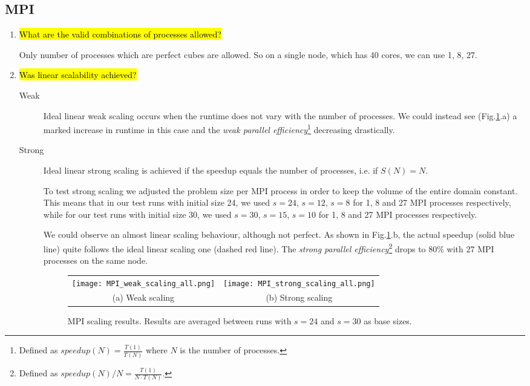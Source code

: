 \documentclass{article}
\begin{document}
\subsection{MPI}
\begin{enumerate}
	\item \hl{What are the valid combinations of processes allowed?}

	Only number of processes which are perfect cubes are allowed. So on a single node, which has 40 cores, we can use 1, 8, 27.
	

	\item \hl{Was linear scalability achieved?}


	\begin{description}
		\item[Weak]	 Ideal linear weak scaling occurs when the runtime does not vary with the number of processes. We could instead see (Fig.\ref{fig:MPI_scaling}.a) a marked increase in runtime in this case and the \emph{weak parallel efficiency}\footnote{Defined as $speedup(N) = \frac{T(1)}{T(N)}$ where $N$ is the number of processes.} decreasing drastically.

		\item[Strong]
		Ideal linear strong scaling is achieved if the speedup equals the number of processes, i.e. if $S(N) = N$.

		To test strong scaling we adjusted the problem size per MPI process in order to keep the volume of the entire domain constant. This means that in our test runs with initial size 24, we used $s=24$, $s=12$, $s=8$ for 1, 8 and 27 MPI processes respectively, while for our test runs with initial size 30, we used $s=30$, $s=15$, $s=10$ for 1, 8 and 27 MPI processes respectively.

		We could observe an almost linear scaling behaviour, although not perfect. As shown in Fig.\ref{fig:MPI_scaling}.b, the actual speedup (solid blue line) quite follows the ideal linear scaling one (dashed red line). The \emph{strong parallel efficiency}\footnote{Defined as $speedup(N)/N = \frac{T(1)}{N \cdot T(N)}$.} drops to $80\%$ with 27 MPI processes on the same node.

		\begin{figure}[p] %
		 	\hspace*{-0.25\linewidth}\begin{tabular}{cc}
		 		\texttt{[image: MPI\_weak\_scaling\_all.png]} & \texttt{[image: MPI\_strong\_scaling\_all.png]} \\
		 		(a) Weak scaling & (b) Strong scaling
		 	\end{tabular}
		 	\caption{MPI scaling results. Results are averaged between runs with $s=24$ and $s=30$ as base sizes.}
		 	\label{fig:MPI_scaling}
		\end{figure}
	\end{description}


\end{enumerate}
\end{document}
